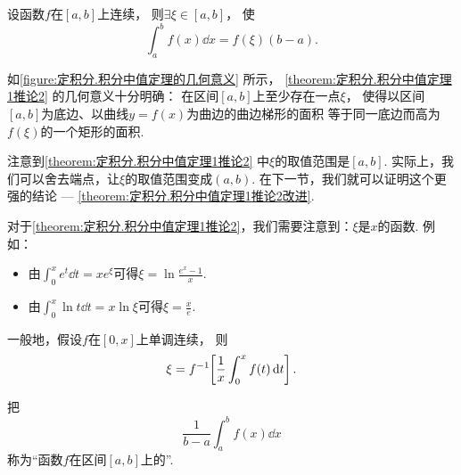 \begin{corollary}\label{theorem:定积分.积分中值定理1推论2}
设函数\(f\)在\([a,b]\)上连续，
则\(\exists\xi\in[a,b]\)，
使\begin{equation}
	\int_a^b f(x) \dd{x} = f(\xi) (b-a).
\end{equation}
\end{corollary}
\begin{remark}
如\cref{figure:定积分.积分中值定理的几何意义} 所示，
\cref{theorem:定积分.积分中值定理1推论2} 的几何意义十分明确：
在区间\([a,b]\)上至少存在一点\(\xi\)，
使得以区间\([a,b]\)为底边、以曲线\(y=f(x)\)为曲边的曲边梯形的面积
等于同一底边而高为\(f(\xi)\)的一个矩形的面积.
\end{remark}
\begin{remark}
注意到\cref{theorem:定积分.积分中值定理1推论2} 中\(\xi\)的取值范围是\([a,b]\).
实际上，我们可以舍去端点，让\(\xi\)的取值范围变成\((a,b)\).
在下一节，我们就可以证明这个更强的结论 --- \cref{theorem:定积分.积分中值定理1推论2改进}.
\end{remark}
\begin{remark}
对于\cref{theorem:定积分.积分中值定理1推论2}，我们需要注意到：\(\xi\)是\(x\)的函数.
例如：\begin{itemize}
	\item 由\(\int_0^x e^t \dd{t} = x e^\xi\)可得\(\xi = \ln\frac{e^x-1}{x}\).
	\item 由\(\int_0^x \ln t \dd{t} = x \ln\xi\)可得\(\xi = \frac{x}{e}\).
\end{itemize}
一般地，假设\(f\)在\([0,x]\)上单调连续，
则\[
	\xi = f^{-1}\kern-2pt\left[ \frac1x \int_0^x f(t) \dd{t} \right].
\]
\end{remark}
\begin{definition}
把\begin{equation}
	\frac{1}{b-a} \int_a^b f(x) \dd{x}
\end{equation}
称为“函数\(f\)在区间\([a,b]\)上的”.
\end{definition}

